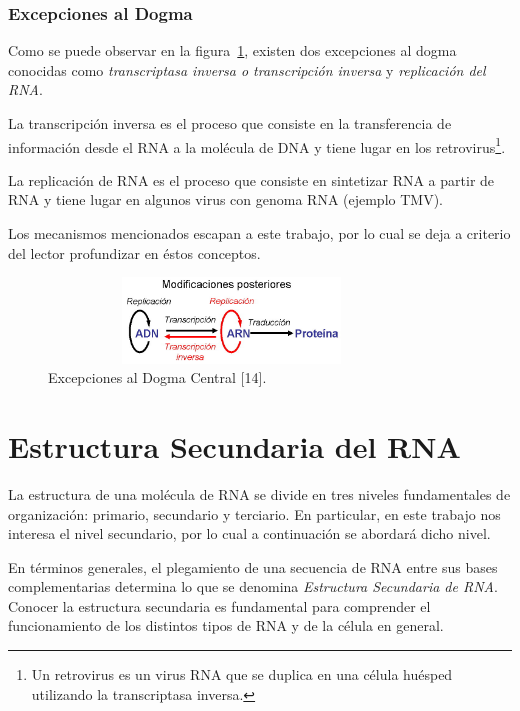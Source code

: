 \subsubsection{Excepciones al Dogma} 

\par Como se puede observar en la figura~\ref{excepcionesDogma}, existen dos excepciones al dogma conocidas como \textit{transcriptasa inversa o transcripción inversa} y \textit{replicación del RNA}.
\par La transcripción inversa\cite{curtis} es el proceso que consiste en la transferencia de información desde el RNA a la molécula de DNA y tiene lugar en los retrovirus\footnote{Un retrovirus es un virus RNA que se duplica en una célula huésped utilizando la transcriptasa inversa.}.
\par La replicación de RNA\cite{curtis} es el proceso que consiste en sintetizar RNA a partir de RNA y tiene lugar en algunos virus con genoma RNA (ejemplo TMV).
\par Los mecanismos mencionados escapan a este trabajo, por lo cual se deja a criterio del lector profundizar en éstos conceptos.
\begin{figure} [h]
	\hspace*{2cm}\includegraphics[width=3.8209in,height=0.9000in]{image/excepcionesDogma.jpg}
	\caption{Excepciones al Dogma Central [14].}
	\label{excepcionesDogma}
\end{figure}	

\vskip 1cm
\section{Estructura Secundaria del RNA} 
La estructura de una molécula de RNA se divide en tres niveles fundamentales de organización: primario, secundario y terciario. En particular, en este trabajo nos interesa el nivel secundario, por lo cual a continuación se abordará dicho nivel.

\par En términos generales, el plegamiento de una secuencia de RNA entre sus bases complementarias determina lo que se denomina \emph{Estructura Secundaria de RNA}. Conocer la estructura secundaria es fundamental para comprender el funcionamiento de los distintos tipos de RNA y de la célula en general. 


